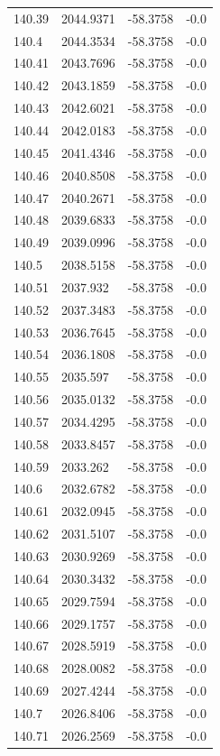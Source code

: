 \begin{table}[H]
\begin{tabular}{llll}
140.39 & 2044.9371 & -58.3758 & -0.0 \\
140.4 & 2044.3534 & -58.3758 & -0.0 \\
140.41 & 2043.7696 & -58.3758 & -0.0 \\
140.42 & 2043.1859 & -58.3758 & -0.0 \\
140.43 & 2042.6021 & -58.3758 & -0.0 \\
140.44 & 2042.0183 & -58.3758 & -0.0 \\
140.45 & 2041.4346 & -58.3758 & -0.0 \\
140.46 & 2040.8508 & -58.3758 & -0.0 \\
140.47 & 2040.2671 & -58.3758 & -0.0 \\
140.48 & 2039.6833 & -58.3758 & -0.0 \\
140.49 & 2039.0996 & -58.3758 & -0.0 \\
140.5 & 2038.5158 & -58.3758 & -0.0 \\
140.51 & 2037.932 & -58.3758 & -0.0 \\
140.52 & 2037.3483 & -58.3758 & -0.0 \\
140.53 & 2036.7645 & -58.3758 & -0.0 \\
140.54 & 2036.1808 & -58.3758 & -0.0 \\
140.55 & 2035.597 & -58.3758 & -0.0 \\
140.56 & 2035.0132 & -58.3758 & -0.0 \\
140.57 & 2034.4295 & -58.3758 & -0.0 \\
140.58 & 2033.8457 & -58.3758 & -0.0 \\
140.59 & 2033.262 & -58.3758 & -0.0 \\
140.6 & 2032.6782 & -58.3758 & -0.0 \\
140.61 & 2032.0945 & -58.3758 & -0.0 \\
140.62 & 2031.5107 & -58.3758 & -0.0 \\
140.63 & 2030.9269 & -58.3758 & -0.0 \\
140.64 & 2030.3432 & -58.3758 & -0.0 \\
140.65 & 2029.7594 & -58.3758 & -0.0 \\
140.66 & 2029.1757 & -58.3758 & -0.0 \\
140.67 & 2028.5919 & -58.3758 & -0.0 \\
140.68 & 2028.0082 & -58.3758 & -0.0 \\
140.69 & 2027.4244 & -58.3758 & -0.0 \\
140.7 & 2026.8406 & -58.3758 & -0.0 \\
140.71 & 2026.2569 & -58.3758 & -0.0 \\

\end{tabular}
\end{table}
